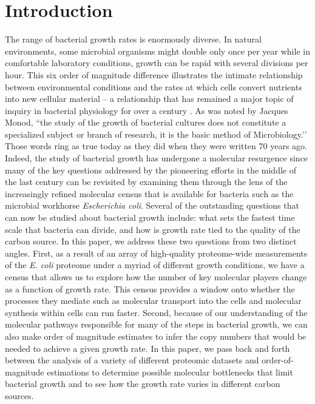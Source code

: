\section{Introduction}
The range of bacterial growth rates is enormously diverse. In natural
environments, some microbial organisms might double only once per year while
in comfortable laboratory conditions, growth can be rapid with several
divisions per hour. This six order of magnitude difference illustrates the
intimate relationship between environmental conditions and the rates at which
cells convert nutrients into new cellular material -- a relationship that has
remained a major topic of inquiry in bacterial physiology for over a century
\citep{jun2018}. As was noted by Jacques Monod, ``the study of the growth of
bacterial cultures does not constitute a specialized subject or branch of
research, it is the basic method of Microbiology.’’ Those words ring as true
today as they did when they were written 70 years ago. Indeed, the study of
bacterial growth has undergone a molecular resurgence since many of the key
questions addressed by the pioneering efforts in the middle of the last
century can be revisited by examining them through the lens of the
increasingly refined molecular census that is available for bacteria such as
the microbial workhorse \textit{Escherichia coli}. Several of the outstanding
questions that can now be studied about bacterial growth include: what sets
the fastest time scale that bacteria can divide, and how is growth rate tied
to the quality of the carbon source. In this paper, we address these two
questions from two distinct angles. First, as a result of an array of
high-quality proteome-wide measurements of the \textit{E. coli} proteome
under a myriad of different growth conditions, we have a census that allows
us to explore how the number of key molecular players change as a function of
growth rate. This census provides a window onto whether the processes they
mediate such as molecular transport into the cells and molecular synthesis
within cells can run faster. Second, because of our understanding of the
molecular pathways responsible for many of the steps in bacterial growth, we
can also make order of magnitude estimates to infer the copy numbers that
would be needed to achieve a given growth rate. In this paper, we pass back
and forth between the analysis of a variety of different proteomic datasets
and order-of-magnitude estimations to determine possible molecular
bottlenecks that limit bacterial growth and to see how the growth rate varies
in different carbon sources.

